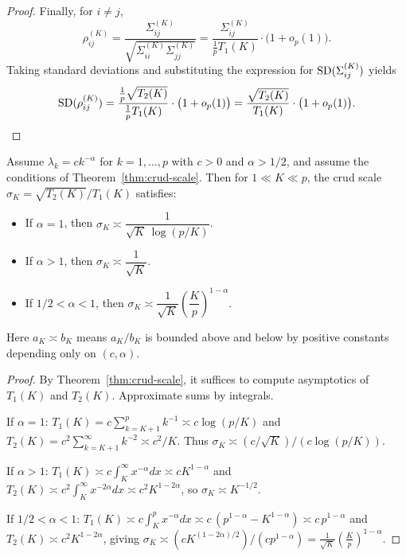 \begin{proof}
Finally, for $i\neq j$,
\begin{equation}
\rho^{(K)}_{ij}
=\frac{\Sigma^{(K)}_{ij}}{\sqrt{\Sigma^{(K)}_{ii}\Sigma^{(K)}_{jj}}}
=\frac{\Sigma^{(K)}_{ij}}{\frac{1}{p}T_1(K)}\cdot \bigl(1+o_p(1)\bigr).
\end{equation}
Taking standard deviations and substituting the expression for $\operatorname{SD}(\Sigma^{(K)}_{ij})$ yields
\begin{equation}
\operatorname{SD}(\rho^{(K)}_{ij})
=\frac{\frac{1}{p}\sqrt{T_2(K)}}{\frac{1}{p}T_1(K)}\cdot \bigl(1+o_p(1)\bigr)
=\frac{\sqrt{T_2(K)}}{T_1(K)}\cdot \bigl(1+o_p(1)\bigr).
\end{equation}
\end{proof}

\begin{corollary}\label{cor:powerlaw}
Assume $\lambda_k = c k^{-\alpha}$ for $k=1,\ldots,p$ with $c>0$ and $\alpha>1/2$,
and assume the conditions of Theorem~\ref{thm:crud-scale}. Then for $1\ll K\ll p$,
the crud scale $\sigma_K=\sqrt{T_2(K)}/T_1(K)$ satisfies:
\begin{itemize}
\item If $\alpha=1$, then $\sigma_K \asymp \dfrac{1}{\sqrt{K}\,\log(p/K)}$.
\item If $\alpha>1$, then $\sigma_K \asymp \dfrac{1}{\sqrt{K}}$.
\item If $1/2<\alpha<1$, then $\sigma_K \asymp \dfrac{1}{\sqrt{K}}\left(\dfrac{K}{p}\right)^{1-\alpha}$.
\end{itemize}
Here $a_K\asymp b_K$ means $a_K/b_K$ is bounded above and below by positive constants depending
only on $(c,\alpha)$.
\end{corollary}

\begin{proof}
By Theorem~\ref{thm:crud-scale}, it suffices to compute asymptotics of $T_1(K)$ and $T_2(K)$.
Approximate sums by integrals.

If $\alpha=1$:
$T_1(K)=c\sum_{k=K+1}^p k^{-1}\asymp c\log(p/K)$ and
$T_2(K)=c^2\sum_{k=K+1}^\infty k^{-2}\asymp c^2/K$.
Thus $\sigma_K\asymp (c/\sqrt{K})/(c\log(p/K))$.

If $\alpha>1$:
$T_1(K)\asymp c\int_K^\infty x^{-\alpha}dx \asymp c K^{1-\alpha}$ and
$T_2(K)\asymp c^2\int_K^\infty x^{-2\alpha}dx \asymp c^2 K^{1-2\alpha}$,
so $\sigma_K\asymp K^{-1/2}$.

If $1/2<\alpha<1$:
$T_1(K)\asymp c\int_K^p x^{-\alpha}dx \asymp c\,(p^{1-\alpha}-K^{1-\alpha})\asymp c\,p^{1-\alpha}$
and $T_2(K)\asymp c^2 K^{1-2\alpha}$, giving
$\sigma_K\asymp (c K^{(1-2\alpha)/2})/(c p^{1-\alpha})
=\frac{1}{\sqrt K}\left(\frac{K}{p}\right)^{1-\alpha}$.
\end{proof}

